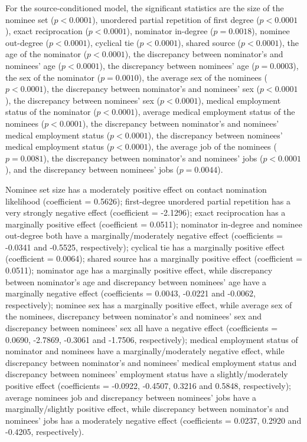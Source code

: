 For the source-conditioned model, the significant statistics are the size of the nominee set ($p<0.0001$), unordered partial repetition of first degree ($p<0.0001$), exact reciprocation ($p<0.0001$), nominator in-degree ($p=0.0018$), nominee out-degree ($p<0.0001$), cyclical tie ($p<0.0001$), shared source ($p<0.0001$), the age of the nominator ($p<0.0001$), the discrepancy between nominator's and nominees' age ($p<0.0001$), the discrepancy between nominees' age ($p=0.0003$), the sex of the nominator ($p=0.0010$), the average sex of the nominees ($p<0.0001$), the discrepancy between nominator's and nominees' sex ($p<0.0001$), the discrepancy between nominees' sex ($p<0.0001$), medical employment status of the nominator ($p<0.0001$), average medical employment status of the nominees ($p<0.0001$), the discrepancy between nominator's and nominees' medical employment status ($p<0.0001$), the discrepancy between nominees' medical employment status ($p<0.0001$), the average job of the nominees ($p=0.0081$), the discrepancy between nominator's and nominees' jobs ($p<0.0001$), and the discrepancy between nominees' jobs ($p=0.0044$). 

Nominee set size has a moderately positive effect on contact nomination likelihood (coefficient = 0.5626); first-degree unordered partial repetition has a very strongly negative effect (coefficient = -2.1296); exact reciprocation has a marginally positive effect (coefficient = 0.0511); nominator in-degree and nominee out-degree both have a marginally/moderately negative effect (coefficients = -0.0341 and -0.5525, respectively); cyclical tie has a marginally positive effect (coefficient = 0.0064); shared source has a marginally positive effect (coefficient = 0.0511); nominator age has a marginally positive effect, while discrepancy between nominator's age and discrepancy between nominees' age have a marginally negative effect (coefficients = 0.0043, -0.0221 and -0.0062, respectively); nominee sex has a marginally positive effect, while average sex of the nominees, discrepancy between nominator's and nominees' sex and discrepancy between nominees' sex all have a negative effect (coefficients = 0.0690, -2.7869, -0.3061 and -1.7506, respectively); medical employment status of nominator and nominees have a marginally/moderately negative effect, while discrepancy between nominator's and nominees' medical employment status and discrepancy between nominees' employment status have a slightly/moderately positive effect (coefficients = -0.0922, -0.4507, 0.3216 and 0.5848, respectively); average nominees job and discrepancy between nominees' jobs have a marginally/slightly positive effect, while discrepancy between nominator's and nominees' jobs has a moderately negative effect (coefficients = 0.0237, 0.2920 and -0.4205, respectively).

